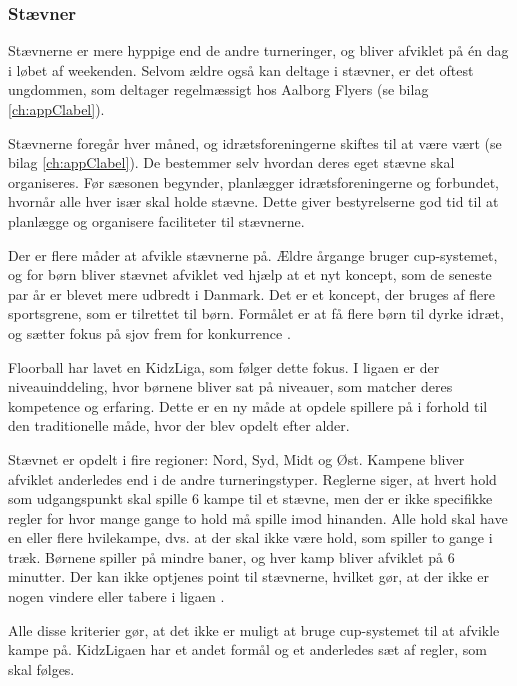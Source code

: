 \subsubsection{Stævner}\label{staevner}
Stævnerne er mere hyppige end de andre turneringer, og bliver afviklet på én dag i løbet af weekenden. Selvom ældre også kan deltage i stævner, er det oftest ungdommen, som deltager regelmæssigt hos Aalborg Flyers (se bilag \ref{ch:appClabel}).
\par
Stævnerne foregår hver måned, og idrætsforeningerne skiftes til at være vært (se bilag \ref{ch:appClabel}). De bestemmer selv hvordan deres eget stævne skal organiseres. Før sæsonen begynder, planlægger idrætsforeningerne og forbundet, hvornår alle hver især skal holde stævne. Dette giver bestyrelserne god tid til at planlægge og organisere faciliteter til stævnerne. 

Der er flere måder at afvikle stævnerne på. Ældre årgange bruger cup-systemet, og for børn bliver stævnet afviklet ved hjælp at et nyt koncept, som de seneste par år er blevet mere udbredt i Danmark. Det er et koncept, der bruges af flere sportsgrene, som er tilrettet til børn. Formålet er at få flere børn til dyrke idræt, og sætter fokus på sjov frem for konkurrence \citep{kidzRegler}.
\par

Floorball har lavet en KidzLiga, som følger dette fokus. I ligaen er der niveauinddeling, hvor børnene bliver sat på niveauer, som matcher deres kompetence og erfaring. Dette er en ny måde at opdele spillere på i forhold til den traditionelle måde, hvor der blev opdelt efter alder.
\par
Stævnet er opdelt i fire regioner: Nord, Syd, Midt og Øst. Kampene bliver afviklet anderledes end i de andre turneringstyper. Reglerne siger, at hvert hold som udgangspunkt skal spille 6 kampe til et stævne, men der er ikke specifikke regler for hvor mange gange to hold må spille imod hinanden. Alle hold skal have en eller flere hvilekampe, dvs. at der skal ikke være hold, som spiller to gange i træk. Børnene spiller på mindre baner, og hver kamp bliver afviklet på 6 minutter. Der kan ikke optjenes point til stævnerne, hvilket gør, at der ikke er nogen vindere eller tabere i ligaen \citep{kidzRegler}.
\par
Alle disse kriterier gør, at det ikke er muligt at bruge cup-systemet til at afvikle kampe på. KidzLigaen har et andet formål og et anderledes sæt af regler, som skal følges.


